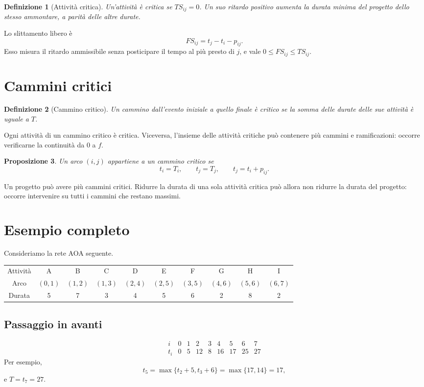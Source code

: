 \documentclass[11pt,a4paper]{article}
\newtheorem{definition}{Definizione}[section]\newtheorem{theorem}[definition]{Teorema}\newtheorem{proposition}[definition]{Proposizione}
\begin{document}
\begin{definition}[Attività critica]
Un'attività è critica se $TS_{ij}=0$. Un suo ritardo positivo aumenta la durata minima del progetto dello stesso ammontare, a parità delle altre durate.
\end{definition}

Lo slittamento libero è
\[FS_{ij}=t_j-t_i-p_{ij}.\]
Esso misura il ritardo ammissibile senza posticipare il tempo al più presto di $j$, e vale $0\leq FS_{ij}\leq TS_{ij}$.

\section{Cammini critici}
\begin{definition}[Cammino critico]
Un cammino dall'evento iniziale a quello finale è critico se la somma delle durate delle sue attività è uguale a $T$.
\end{definition}
Ogni attività di un cammino critico è critica. Viceversa, l'insieme delle attività critiche può contenere più cammini e ramificazioni: occorre verificarne la continuità da $0$ a $f$.

\begin{proposition}
Un arco $(i,j)$ appartiene a un cammino critico se
\[t_i=T_i,\qquad t_j=T_j,\qquad t_j=t_i+p_{ij}.\]
\end{proposition}

\begin{warningbox}
Un progetto può avere più cammini critici. Ridurre la durata di una sola attività critica può allora non ridurre la durata del progetto: occorre intervenire su tutti i cammini che restano massimi.
\end{warningbox}

\section{Esempio completo}
Consideriamo la rete AOA seguente.
\begin{center}\small
\begin{tabular}{cccccccccc}\toprule
Attività&A&B&C&D&E&F&G&H&I\\
Arco&$(0,1)$&$(1,2)$&$(1,3)$&$(2,4)$&$(2,5)$&$(3,5)$&$(4,6)$&$(5,6)$&$(6,7)$\\
Durata&5&7&3&4&5&6&2&8&2\\\bottomrule
\end{tabular}\end{center}

\subsection{Passaggio in avanti}
\[\begin{array}{c|rrrrrrrr}i&0&1&2&3&4&5&6&7\\\hline t_i&0&5&12&8&16&17&25&27\end{array}\]
Per esempio,
\[t_5=\max\{t_2+5,t_3+6\}=\max\{17,14\}=17,\]
e $T=t_7=27$.
\end{document}
